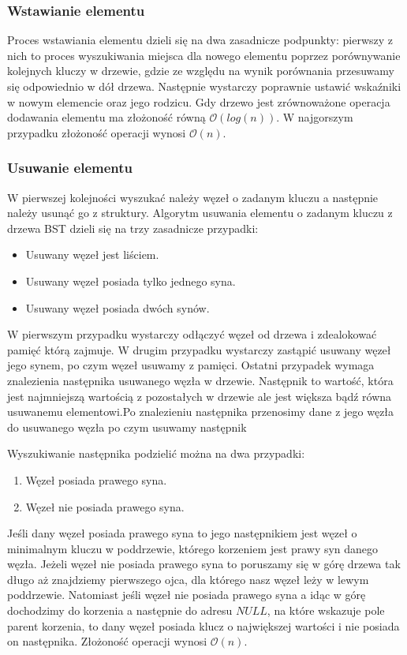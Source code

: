 \documentclass{article}
\begin{document}
\subsubsection{Wstawianie elementu}

Proces wstawiania elementu dzieli się na dwa zasadnicze podpunkty: pierwszy z nich to proces wyszukiwania miejsca dla nowego elementu poprzez porównywanie kolejnych kluczy w drzewie, gdzie ze względu na wynik porównania przesuwamy się odpowiednio w dół drzewa. Następnie wystarczy poprawnie ustawić wskaźniki w nowym elemencie oraz jego rodzicu. Gdy drzewo jest zrównoważone operacja dodawania elementu ma złożoność równą  $\mathcal{O}(log(n))$. W najgorszym przypadku złożoność operacji wynosi $\mathcal{O}(n)$.

\subsubsection{Usuwanie elementu}

W pierwszej kolejności wyszukać należy węzeł o zadanym kluczu a następnie należy usunąć go z struktury.
Algorytm usuwania elementu o zadanym kluczu z drzewa BST dzieli się na trzy zasadnicze przypadki:

\begin{itemize}
    \item Usuwany węzeł jest liściem.
    \item Usuwany węzeł posiada tylko jednego syna.
    \item Usuwany węzeł posiada dwóch synów.
\end{itemize}

W pierwszym przypadku wystarczy odłączyć węzeł od drzewa i zdealokować pamięć którą zajmuje.
W drugim przypadku wystarczy zastąpić usuwany węzeł jego synem, po czym węzeł usuwamy z pamięci.
Ostatni przypadek wymaga znalezienia następnika usuwanego węzła w drzewie. Następnik to wartość, która jest najmniejszą wartością z pozostałych w drzewie ale jest większa bądź równa usuwanemu elementowi.Po znalezieniu następnika przenosimy dane z jego węzła do usuwanego węzła po czym usuwamy następnik

Wyszukiwanie następnika podzielić można na dwa przypadki:
\begin{enumerate}
    \item Węzeł posiada prawego syna.
    \item Węzeł nie posiada prawego syna.
\end{enumerate}

Jeśli dany węzeł posiada prawego syna to jego następnikiem jest węzeł o minimalnym kluczu w poddrzewie, którego korzeniem jest prawy syn danego węzła. Jeżeli węzeł nie posiada prawego syna to poruszamy się w górę drzewa tak długo aż znajdziemy pierwszego ojca, dla którego nasz węzeł leży w lewym poddrzewie. Natomiast jeśli węzeł nie posiada prawego syna a idąc w górę dochodzimy do korzenia a następnie do adresu $NULL$, na które wskazuje pole parent korzenia, to dany węzeł posiada klucz o największej wartości i nie posiada on następnika. Złożoność operacji wynosi $\mathcal{O}(n)$.
\end{document}
